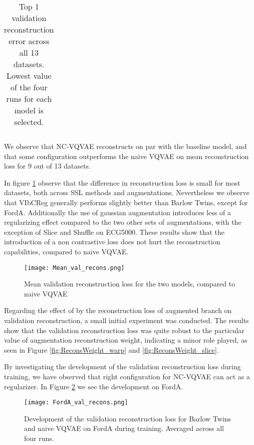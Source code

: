 \documentclass[../../thesis.tex]{subfiles}
\begin{document}
\begin{table}[H]
\begin{adjustbox}{width=\textwidth}
\begin{tabular}{lc|c|c|c|c|c|c}
  
        \bottomrule
    \end{tabular}
    \end{adjustbox}
    \caption{Top 1 validation reconstruction error across all 13 datasets. Lowest value of the four runs for each model is selected.}
    \label{tab:best_recons}
\end{table}

We observe that NC-VQVAE reconstructs on par with the baseline model, and that some configuration outperforms the naive VQVAE on mean reconstruction loss for 9 out of 13 datasets.\newline

In figure \ref{fig:Mean_val_recons} observe that the difference in reconstruction loss is small for most datasets, both across SSL methods and augmentations. Nevertheless we observe that VIbCReg generally performs slightly better than Barlow Twins, except for FordA. Additionally the use of gaussian augmentation introduces less of a regularizing effect compared to the two other sets of augmentations, with the exception of Slice and Shuffle on ECG5000. These results show that the introduction of a non contrastive loss does not hurt the reconstruction capabilities, compared to naive VQVAE. \newline

\begin{figure}[h]
    \texttt{[image: Mean\_val\_recons.png]}
    \centering  
    \caption{Mean validation reconstruction loss for the two models, compared to naive VQVAE}
    \label{fig:Mean_val_recons}
\end{figure}

Regarding the effect of by the reconstruction loss of augmented branch on validation reconstruction, a small initial experiment was conducted. The results show that the validation reconstruction loss was quite robust to the particular value of augmentation reconstruction weight, indicating a minor role played, as seen in Figure \ref{fig:ReconsWeight_warp} and \ref{fig:ReconsWeight_slice}.\newline

By investigating the development of the validation reconstruction loss during training, we have observed that right configuration for NC-VQVAE can act as a regularizer. In Figure \ref{fig:FordA_val_recons} we see the development on FordA. 

\begin{figure}[h]
    \texttt{[image: FordA\_val\_recons.png]}
    \centering  
    \caption{Development of the validation reconstruction loss for Barlow Twins and naive VQVAE on FordA during training. Averaged across all four runs. }
    \label{fig:FordA_val_recons}
\end{figure}
\end{document}
